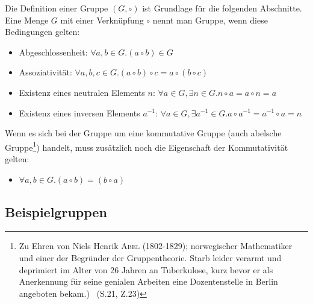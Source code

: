 \documentclass[12pt,a4paper, usenames, dvipsnames]{article}
\begin{document}
Die Definition einer Gruppe $(G, \circ)$ ist Grundlage für die folgenden Abschnitte. Eine Menge $G$ mit einer Verknüpfung $\circ$ nennt man Gruppe, wenn diese Bedingungen gelten: 
\begin{itemize}
\item Abgeschlossenheit: $\forall a,b \in G.(a \circ b) \in G $
\item Assoziativität: $\forall a,b,c \in G.(a \circ b) \circ c = a \circ (b \circ c)$
\item Existenz eines neutralen Elements $n$: $\forall a \in G, \exists n \in G.n \circ a = a \circ n = a$ 
\item Existenz eines inversen Elements $a^{-1}$: $\forall a \in G, \exists a^{-1} \in G. a \circ a^{-1} = a^{-1} \circ a = n$ 
\end{itemize}
Wenn es sich bei der Gruppe um eine kommutative Gruppe (auch abelsche Gruppe\footnote{\glqq Zu Ehren von Niels Henrik \textsc{Abel} (1802-1829); norwegischer Mathematiker und einer der Begründer der Gruppentheorie. Starb leider verarmt und deprimiert im Alter von 26 Jahren an Tuberkulose, kurz bevor er als Anerkennung für seine genialen Arbeiten  eine Dozentenstelle in Berlin angeboten bekam.)\grqq \  \cite{Buch} (S.21, Z.23)}) handelt, muss zusätzlich noch die Eigenschaft der Kommutativität gelten: 
\begin{itemize}
\item $\forall a,b \in G.(a \circ b) = (b \circ a) $
\end{itemize}

 


















\subsection*{Beispielgruppen} 
\end{document}
